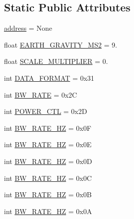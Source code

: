 \subsection*{Static Public Attributes}
\begin{DoxyCompactItemize}
\item 
\hyperlink{classlibsensorPy_1_1concretesensor_1_1adxl345_1_1ADXL345_a296a648b827c579838c683b448b6d133}{address} = None
\item 
float \hyperlink{classlibsensorPy_1_1concretesensor_1_1adxl345_1_1ADXL345_ab73af0b9222f459d1cfa1ee7ca3c9e49}{E\+A\+R\+T\+H\+\_\+\+G\+R\+A\+V\+I\+T\+Y\+\_\+\+M\+S2} = 9.
\item 
float \hyperlink{classlibsensorPy_1_1concretesensor_1_1adxl345_1_1ADXL345_a8038c2c38501d03d5e37d34c2b412da4}{S\+C\+A\+L\+E\+\_\+\+M\+U\+L\+T\+I\+P\+L\+I\+E\+R} = 0.
\item 
int \hyperlink{classlibsensorPy_1_1concretesensor_1_1adxl345_1_1ADXL345_af16a50f4c549f0f5b7240642b0614e92}{D\+A\+T\+A\+\_\+\+F\+O\+R\+M\+A\+T} = 0x31
\item 
int \hyperlink{classlibsensorPy_1_1concretesensor_1_1adxl345_1_1ADXL345_a21c553a63995d239a6e5131211c51e89}{B\+W\+\_\+\+R\+A\+T\+E} = 0x2\+C
\item 
int \hyperlink{classlibsensorPy_1_1concretesensor_1_1adxl345_1_1ADXL345_a6bf113a16ea8e8444f93cf4f78f83d74}{P\+O\+W\+E\+R\+\_\+\+C\+T\+L} = 0x2\+D
\item 
int \hyperlink{classlibsensorPy_1_1concretesensor_1_1adxl345_1_1ADXL345_a1b510085f0c35affabd53eb8b1382e40}{B\+W\+\_\+\+R\+A\+T\+E\+\_\+H\+Z} = 0x0\+F
\item 
int \hyperlink{classlibsensorPy_1_1concretesensor_1_1adxl345_1_1ADXL345_ae453cc11d0102b1d983b4418d3bf4c71}{B\+W\+\_\+\+R\+A\+T\+E\+\_\+H\+Z} = 0x0\+E
\item 
int \hyperlink{classlibsensorPy_1_1concretesensor_1_1adxl345_1_1ADXL345_ac19a87cffb49e1ae19fc819d37cb2c37}{B\+W\+\_\+\+R\+A\+T\+E\+\_\+H\+Z} = 0x0\+D
\item 
int \hyperlink{classlibsensorPy_1_1concretesensor_1_1adxl345_1_1ADXL345_ae362a9289eaa70f38be2b91c59401764}{B\+W\+\_\+\+R\+A\+T\+E\+\_\+H\+Z} = 0x0\+C
\item 
int \hyperlink{classlibsensorPy_1_1concretesensor_1_1adxl345_1_1ADXL345_a729f53ca923b653b3b94e016a8937fe6}{B\+W\+\_\+\+R\+A\+T\+E\+\_\+H\+Z} = 0x0\+B
\item 
int \hyperlink{classlibsensorPy_1_1concretesensor_1_1adxl345_1_1ADXL345_a4b288b4f38ad8b114d8640cfbf087418}{B\+W\+\_\+\+R\+A\+T\+E\+\_\+H\+Z} = 0x0\+A

\end{DoxyCompactItemize}
